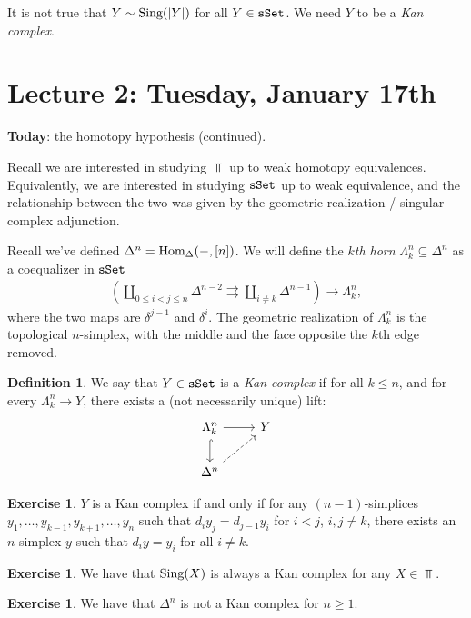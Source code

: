 \documentclass[12pt]{amsart}
\theoremstyle{definition}
\newtheorem{definition}[theorem]{Definition}
\newtheorem{exercise}[theorem]{Exercise}
\begin{document}
It is not true that $Y \sim \text{Sing}(|Y|)$ for all $Y \in \texttt{sSet}$. We need $Y$ to be a \textit{Kan complex}.


\section{Lecture 2: Tuesday, January 17th}

\textbf{Today}: the homotopy hypothesis (continued).

Recall we are interested in studying $\Top$ up to weak homotopy equivalences. Equivalently, we are interested in studying $\texttt{sSet}$ up to weak equivalence, and the relationship between the two was given by the geometric realization / singular complex adjunction.

Recall we've defined $\Delta^n = \text{Hom}_\Delta(-,[n])$. We will define the $k$\textit{th horn} $\Lambda^n_k \subseteq \Delta^n$ as a coequalizer in $\texttt{sSet}$
\begin{align*}
    \left(\coprod_{0 \le i < j \le n} \Delta^{n-2} \rightrightarrows \coprod_{i\ne k} \Delta^{n-1} \right) \to \Lambda^n_k,
\end{align*}
where the two maps are $\delta^{j-1}$ and $\delta^i$. The geometric realization of $\Lambda^n_k$ is the topological $n$-simplex, with the middle and the face opposite the $k$th edge removed.

\begin{definition} We say that $Y\in \texttt{sSet}$ is a \textit{Kan complex} if for all $k\le n$, and for every $\Lambda^n_k \to Y$, there exists a (not necessarily unique) lift:
\[ \begin{tikzcd}
    \Lambda^n_k\dar[hook]\rar & Y\\
    \Delta^n\ar[ur,dashed] & 
\end{tikzcd} \]
\end{definition}

\begin{exercise} $Y$ is a Kan complex if and only if for any $(n-1)$-simplices $y_1, \ldots, y_{k-1},y_{k+1}, \ldots, y_n$ such that $d_i y_j = d_{j-1} y_i$ for $i< j$, $i,j\ne k$, there exists an $n$-simplex $y$ such that $d_i y = y_i$ for all $i\ne k$.
\end{exercise}

\begin{exercise} We have that $\text{Sing}(X)$ is always a Kan complex for any $X\in \Top$.
\end{exercise}

\begin{exercise} We have that $\Delta^n$ is not a Kan complex for $n \ge 1$.
\end{exercise}
\end{document}
